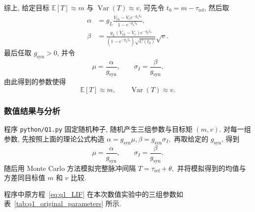 ﻿\documentclass[UTF8,  zihao=-4]{ctexart}
\begin{document}
综上,  给定目标 \(\mathbb E[T]\approx m\) 与 \(\operatorname{Var}(T)\approx v\),  可先令 \(t_0=m-\tau_{\mathrm{ref}}\),  然后取
\begin{equation}
\begin{aligned}
    \alpha
    &=
    g_L
    \frac{V_{th}-V_re^{-g_Lt_0}}
    {1-e^{-g_Lt_0}}, \\
    \beta
    &=
    \frac{
    g_L(V_{th}-V_r)e^{-g_Lt_0}
    }
    {
    \left(1-e^{-g_Lt_0}\right)\sqrt{C(t_0)}
    }
    \sqrt{v}.
\end{aligned}
\end{equation}
最后任取 \(g_{\mathrm{syn}}>0\),  并令
\[
    \mu=\frac{\alpha}{g_{\mathrm{syn}}}, 
    \qquad
    \sigma_I=\frac{\beta}{g_{\mathrm{syn}}}.
\]
由此得到的参数使得
\[
    \mathbb E[T]\approx m, 
    \qquad
    \operatorname{Var}(T)\approx v.
\]

\subsubsection{数值结果与分析}
程序 \texttt{python/Q1.py} 固定随机种子,  随机产生三组参数与目标矩 \((m,  v)\). 对每一组参数,  先按照上面的理论公式构造
$
    \alpha=g_{\mathrm{syn}}\mu, 
    \beta=g_{\mathrm{syn}}\sigma_I, 
$
再取给定的 \(g_{\mathrm{syn}}\),  得到
\[
    \mu=\frac{\alpha}{g_{\mathrm{syn}}}, 
    \qquad
    \sigma_I=\frac{\beta}{g_{\mathrm{syn}}}.
\]
随后用 Monte Carlo 方法模拟完整脉冲间隔
$
    T=\tau_{\mathrm{ref}}+\theta, 
$
并将模拟得到的均值与方差同目标值 \(m\) 和 \(v\) 比较. 

程序中原方程~\eqref{eq:q1_LIF}
在本次数值实验中的三组参数如表~\ref{tab:q1_original_parameters} 所示.

\begin{table}[htbp]
\centering
\small
\caption{第1题第2小问原方程参数设置}
\label{tab:q1_original_parameters}
\end{table}
\end{document}
